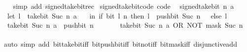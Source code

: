 \begin{isabellebody}
%
\isadelimproof
\ \ %
\endisadelimproof
%
\isatagproof
{}\isamarkupfalse%
\ {\isacharparenleft}{\kern0pt}simp\ add{\isacharcolon}{\kern0pt}\ signed{\isacharunderscore}{\kern0pt}take{\isacharunderscore}{\kern0pt}bit{\isacharunderscore}{\kern0pt}rec{\isacharparenright}{\kern0pt}%
\endisatagproof
{\isafoldproof}%
%
\isadelimproof
\isanewline
%
\endisadelimproof
\isanewline
{}\isamarkupfalse%
\ signed{\isacharunderscore}{\kern0pt}take{\isacharunderscore}{\kern0pt}bit{\isacharunderscore}{\kern0pt}code\ {\isacharbrackleft}{\kern0pt}code{\isacharbrackright}{\kern0pt}{\isacharcolon}{\kern0pt}\isanewline
\ \ {\isacartoucheopen}signed{\isacharunderscore}{\kern0pt}take{\isacharunderscore}{\kern0pt}bit\ n\ a\ {\isacharequal}{\kern0pt}\isanewline
\ \ {\isacharparenleft}{\kern0pt}let\ l\ {\isacharequal}{\kern0pt}\ take{\isacharunderscore}{\kern0pt}bit\ {\isacharparenleft}{\kern0pt}Suc\ n{\isacharparenright}{\kern0pt}\ a\isanewline
\ \ \ in\ if\ bit\ l\ n\ then\ l\ {\isacharplus}{\kern0pt}\ push{\isacharunderscore}{\kern0pt}bit\ {\isacharparenleft}{\kern0pt}Suc\ n{\isacharparenright}{\kern0pt}\ {\isacharparenleft}{\kern0pt}{\isacharminus}{\kern0pt}\ {}{\isacharparenright}{\kern0pt}\ else\ l{\isacharparenright}{\kern0pt}{\isacartoucheclose}\isanewline
%
\isadelimproof
%
\endisadelimproof
%
\isatagproof
{}\isamarkupfalse%
\ {\isacharminus}{\kern0pt}\isanewline
\ \ \isamarkupfalse%
\ {\isacharasterisk}{\kern0pt}{\isacharcolon}{\kern0pt}\ {\isacartoucheopen}take{\isacharunderscore}{\kern0pt}bit\ {\isacharparenleft}{\kern0pt}Suc\ n{\isacharparenright}{\kern0pt}\ a\ {\isacharplus}{\kern0pt}\ push{\isacharunderscore}{\kern0pt}bit\ n\ {\isacharparenleft}{\kern0pt}{\isacharminus}{\kern0pt}\ {}{\isacharparenright}{\kern0pt}\ {\isacharequal}{\kern0pt}\isanewline
\ \ \ \ take{\isacharunderscore}{\kern0pt}bit\ {\isacharparenleft}{\kern0pt}Suc\ n{\isacharparenright}{\kern0pt}\ a\ OR\ NOT\ {\isacharparenleft}{\kern0pt}mask\ {\isacharparenleft}{\kern0pt}Suc\ n{\isacharparenright}{\kern0pt}{\isacharparenright}{\kern0pt}{\isacartoucheclose}\isanewline
\ \ \ \ \isamarkupfalse%
\ {\isacharparenleft}{\kern0pt}auto\ simp\ add{\isacharcolon}{\kern0pt}\ bit{\isacharunderscore}{\kern0pt}take{\isacharunderscore}{\kern0pt}bit{\isacharunderscore}{\kern0pt}iff\ bit{\isacharunderscore}{\kern0pt}push{\isacharunderscore}{\kern0pt}bit{\isacharunderscore}{\kern0pt}iff\ bit{\isacharunderscore}{\kern0pt}not{\isacharunderscore}{\kern0pt}iff\ bit{\isacharunderscore}{\kern0pt}mask{\isacharunderscore}{\kern0pt}iff\ disjunctive{\isacharunderscore}{\kern0pt}add\isanewline

\end{isabellebody}
